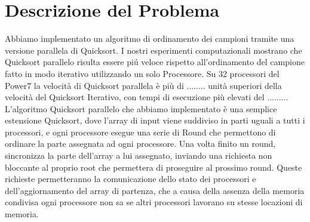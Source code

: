 \chapter{Descrizione del Problema}

Abbiamo implementato un algoritmo di ordinamento dei campioni tramite una versione parallela di Quicksort.
I nostri esperimenti computazionali mostrano che Quicksort parallelo risulta essere piú veloce rispetto all'ordinamento del campione fatto in modo iterativo utilizzando un solo  Processore.
Su 32 processori del Power7 la velocità di Quicksort parallela è più di ........
unità superiori della velocità del Quicksort Iterativo, con tempi di esecuzione più elevati del .........%
L'algoritmo Quicksort parallelo che abbiamo implementato è una semplice estensione Quicksort, dove l'array di input viene suddiviso in parti uguali a tutti i processori, e ogni processore esegue una serie di Round che permettono di ordinare la parte assegnata ad ogni processore.
Una volta finito un round, sincronizza la parte dell'array a lui assegnato, inviando una richiesta non bloccante al proprio root che permettera di proseguire al prossimo round. Queste richieste permetteranno la comunicazione dello stato dei processori e dell'aggiornamento del array di partenza, che a causa della assenza della memoria condivisa ogni processore non sa se altri processori lavorano su stesse locazioni di memoria.